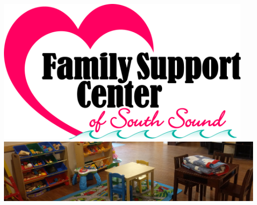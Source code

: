 \documentclass[14pt]{extarticle}
\begin{document}
\begin{flushright}
\includegraphics[width = 0.95\textwidth]{logo.jpg}
\includegraphics[width=\textwidth]{living-room.jpg}
\end{flushright}
\end{document}

